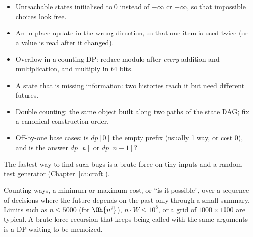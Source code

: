 \begin{pitfall}
\begin{itemize}
  \item Unreachable states initialised to 0 instead of $-\infty$ or $+\infty$, so that impossible choices look free.
  \item An in-place update in the wrong direction, so that one item is used twice (or a value is read after it changed).
  \item Overflow in a counting DP: reduce modulo after \emph{every} addition and multiplication, and multiply in 64 bits.
  \item A state that is missing information: two histories reach it but need different futures.
  \item Double counting: the same object built along two paths of the state DAG; fix a canonical construction order.
  \item Off-by-one base cases: is $dp[0]$ the empty prefix (usually 1 way, or cost 0), and is the answer $dp[n]$ or $dp[n-1]$?
\end{itemize}
The fastest way to find such bugs is a brute force on tiny inputs and a random test generator (Chapter~\ref{ch:craft}).
\end{pitfall}

\begin{recognize}
Counting ways, a minimum or maximum cost, or ``is it possible'', over a sequence of decisions where the future depends on the past
only through a small summary. Limits such as $n \le 5000$ (for $\Oh{n^2}$), $n \cdot W \le 10^8$, or a grid of $1000 \times 1000$
are typical. A brute-force recursion that keeps being called with the same arguments is a DP waiting to be memoized.
\end{recognize}


